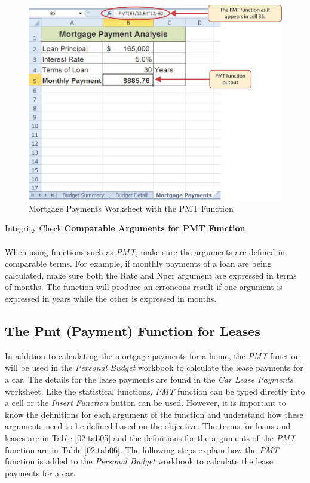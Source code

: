 \begin{figure}[H]
	\centering
	\includegraphics[width=\maxwidth{.95\linewidth}]{gfx/ch02_fig33}
	\caption{Mortgage Payments Worksheet with the PMT Function}
	\label{02:fig33}
\end{figure}

\begin{center}
	\begin{infobox}{Integrity Check}
		\textbf{Comparable Arguments for PMT Function}
		\\
		\\
		When using functions such as \textit{PMT}, make sure the arguments are defined in comparable terms. For example, if monthly payments of a loan are being calculated, make sure both the Rate and Nper argument are expressed in terms of months. The function will produce an erroneous result if one argument is expressed in years while the other is expressed in months.
	\end{infobox}
\end{center}

\subsection{The Pmt (Payment) Function for Leases}

In addition to calculating the mortgage payments for a home, the \textit{PMT} function will be used in the \textit{Personal Budget} workbook to calculate the lease payments for a car. The details for the lease payments are found in the \textit{Car Lease Payments} worksheet. Like the statistical functions, \textit{PMT} function can be typed directly into a cell or the \textit{Insert Function} button can be used. However, it is important to know the definitions for each argument of the function and understand how these arguments need to be defined based on the objective. The terms for loans and leases are in Table \ref{02:tab05} and the definitions for the arguments of the \textit{PMT} function are in Table \ref{02:tab06}. The following steps explain how the \textit{PMT} function is added to the \textit{Personal Budget} workbook to calculate the lease payments for a car.

